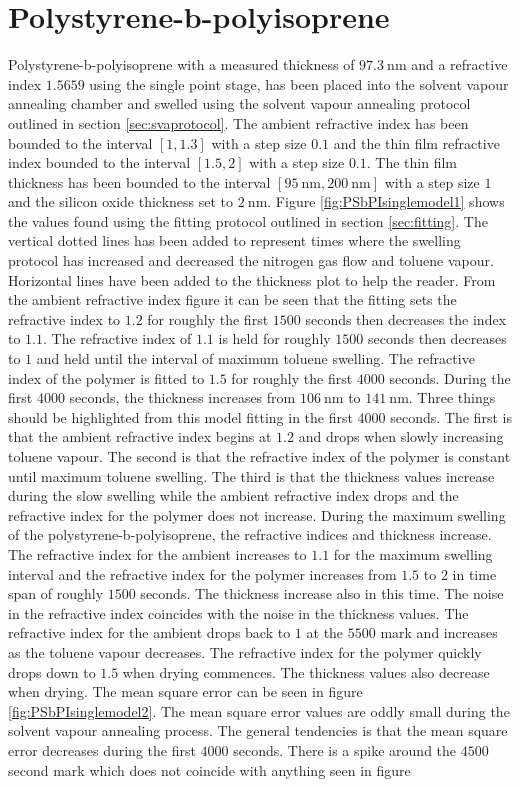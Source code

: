 \documentclass[MasterThesisMain.tex]{subfiles}
\begin{document}
\section{Polystyrene-b-polyisoprene} 
Polystyrene-b-polyisoprene with a measured thickness of $\SI{97.3}{\nano\meter}$ and a refractive index $1.5659$ using the single point stage, has been placed into the solvent vapour annealing chamber and swelled using the solvent vapour annealing protocol outlined in section \ref{sec:svaprotocol}. The ambient refractive index has been bounded to the interval $[1,1.3]$ with a step size $0.1$ and the thin film refractive index bounded to the interval $[1.5,2]$ with a step size $0.1$. The thin film thickness has been bounded to the interval $[\SI{95}{\nano\meter},\SI{200}{\nano\meter}]$ with a step size $1$ and the silicon oxide thickness set to $\SI{2}{\nano\meter}$. Figure \ref{fig:PSbPIsinglemodel1} shows the values found using the fitting protocol outlined in section \ref{sec:fitting}. The vertical dotted lines has been added to represent times where the swelling protocol has increased and decreased the nitrogen gas flow and toluene vapour. Horizontal lines have been added to the thickness plot to help the reader. From the ambient refractive index figure it can be seen that the fitting sets the refractive index to $1.2$ for roughly the first $1500$ seconds then decreases the index to $1.1$. The refractive index of $1.1$ is held for roughly $1500$ seconds then decreases to $1$ and held until the interval of maximum toluene swelling. The refractive index of the polymer is fitted to $1.5$ for roughly the first $4000$ seconds. During the first $4000$ seconds, the thickness increases from $\SI{106}{\nano\meter}$ to $\SI{141}{\nano\meter}$. Three things should be highlighted from this model fitting in the first $4000$ seconds. The first is that the ambient refractive index begins at $1.2$ and drops when slowly increasing toluene vapour. The second is that the refractive index of the polymer is constant until maximum toluene swelling. The third is that the thickness values increase during the slow swelling while the ambient refractive index drops and the refractive index for the polymer does not increase. During the maximum swelling of the polystyrene-b-polyisoprene, the refractive indices and thickness increase. The refractive index for the ambient increases to $1.1$ for the maximum swelling interval and the refractive index for the polymer increases from $1.5$ to $2$ in time span of roughly $1500$ seconds. The thickness increase also in this time. The noise in the refractive index coincides with the noise in the thickness values. The refractive index for the ambient drops back to $1$ at the $5500$ mark and increases as the toluene vapour decreases. The refractive index for the polymer quickly drops down to $1.5$ when drying commences. The thickness values also decrease when drying. The mean square error can be seen in figure \ref{fig:PSbPIsinglemodel2}. The mean square error values are oddly small during the solvent vapour annealing process. The general tendencies is that the mean square error decreases during the first $4000$ seconds. There is a spike around the $4500$ second mark which does not coincide with anything seen in figure 
\end{document}
